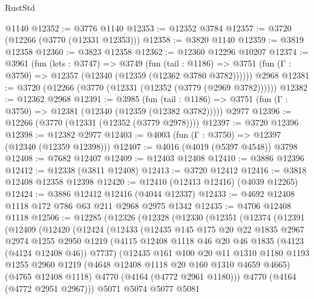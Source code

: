 \begin{lexlean}{RustStd}
\begin{coremodule}
    @1140
@12352 := @3776 @1140
@12353 := @12352 @3784
@12357 := @3720 (@12266 (@3770 (@12331 @12353)))
@12358 := @3820 @1140
@12359 := @3819 @12358
@12360 := @3823 @12358
@12362 := @12360 @12296 @10207
@12374 := @3961
    (fun (lets : @3747) =>
    @3749
      (fun (tail : @1186) =>
      @3751 (fun (Γ : @3750) => @12357 (@12340 (@12359 (@12362 @3780 @3782))))))
    @2968
@12381 := @3720 (@12266 (@3770 (@12331 (@12352 (@3779 (@2969 @3782))))))
@12382 := @12362 @2968
@12391 := @3985
    (fun (tail : @1186) => @3751 (fun (Γ : @3750) => @12381 (@12340 (@12359 (@12382 @3782)))))
    @2977
@12396 := @12266 (@3770 (@12331 (@12352 (@3779 @2978))))
@12397 := @3720 @12396
@12398 := @12382 @2977
@12403 := @4003 (fun (Γ : @3750) => @12397 (@12340 (@12359 @12398)))
@12407 := @4016 (@4019 (@5397 @4548)) @3798
@12408 := @7682 @12407
@12409 := @12403 @12408
@12410 := @3886 @12396
@12412 := @12338 (@3811 @12408)
@12413 := @3720 @12412
@12416 := @3818 @12408 @12358 @12398
@12420 := @12410 (@12413 @12416) (@4039 @12265)
@12424 := @3886 @12412 @12416 (@4044 @12337)
@12433 := @4692 @12408 @1118 @172 @786 @63 @211 @2968 @2975 @1342
@12435 := @4706 @12408 @1118
@12506 := @12285
    (@12326
      (@12328
        (@12330
          (@12351
            (@12374
              (@12391
                (@12409
                  (@12420
                    (@12424
                      (@12433
                        (@12435
                          @145
                          @175
                          @20
                          @22
                          @1835
                          @2967
                          @2974
                          @1255
                          @2950
                          @1219
                          (@4115 @12408 @1118 @46 @20 @46 @1835 (@4123 (@4124 @12408 @46)) @7737)
                          (@12435
                            @161
                            @100
                            @20
                            @11
                            @1310
                            @1180
                            @1193
                            @1255
                            @2960
                            @1219
                            (@4648 @12408 @1118 @20 @160 @1310 @4659 @4665)
                            (@4765 @12408 @1118)
                            @4770
                            (@4164 (@4772 @2961 @1180)))
                          @4770
                          (@4164 (@4772 @2951 @2967)))
                        @5071
                        @5074
                        @5077
                        @5081

\end{coremodule}
\end{lexlean}
